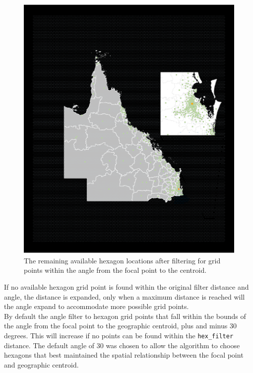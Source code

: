 \begin{figure}[h]
\centering
\includegraphics[width=16cm]{figs/5allocate.png}
\caption{\label{fig:angles}The remaining available hexagon locations after filtering for grid points within the angle from the focal point to the centroid.}
\end{figure}

If no available hexagon grid point is found within the original filter
distance and angle, the distance is expanded, only when a maximum
distance is reached will the angle expand to accommodate more possible
grid points.\\
By default the angle filter to hexagon grid points that fall within the
bounds of the angle from the focal point to the geographic centroid,
plus and minus 30 degrees. This will increase if no points can be found
within the \texttt{hex\_filter} distance. The default angle of 30 was
chosen to allow the algorithm to choose hexagons that best maintained
the spatial relationship between the focal point and geographic
centroid.

